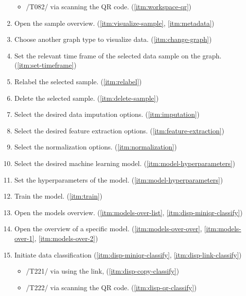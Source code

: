 \begin{enumerate}[{label = \textbf{/T{\protect\twodigits{\arabic{enumi}}}0/}, leftmargin = *}]
\begin{itemize}
        \item /T082/ via scanning the QR code. (\ref{itm:workspace-qr})
    \end{itemize}
    \item Open the sample overview. (\ref{itm:visualize-sample}, \ref{itm:metadata})
    \item Choose another graph type to visualize data. (\ref{itm:change-graph})
    \item Set the relevant time frame of the selected data sample on the graph. (\ref{itm:set-timeframe})
    \item Relabel the selected sample. (\ref{itm:relabel})
    \item Delete the selected sample. (\ref{itm:delete-sample})
    \item Select the desired data imputation options. (\ref{itm:imputation})
    \item Select the desired feature extraction options. (\ref{itm:feature-extraction})
    \item Select the normalization options. (\ref{itm:normalization})
    \item Select the desired machine learning model. (\ref{itm:model-hyperparameters})
    \item Set the hyperparameters of the model. (\ref{itm:model-hyperparameters})
    \item Train the model. (\ref{itm:train})
    \item Open the models overview. (\ref{itm:models-over-list}, \ref{itm:disp-miniqr-classify})
    \item Open the overview of a specific model. (\ref{itm:models-over-over}, \ref{itm:models-over-1}, \ref{itm:models-over-2})
    \item Initiate data classification (\ref{itm:disp-miniqr-classify}, \ref{itm:disp-link-classify})
    \begin{itemize}
        \item /T221/ via using the link, (\ref{itm:disp-copy-classify})
        \item /T222/ via scanning the QR code. (\ref{itm:disp-qr-classify})
    \end{itemize} 
\end{enumerate}

